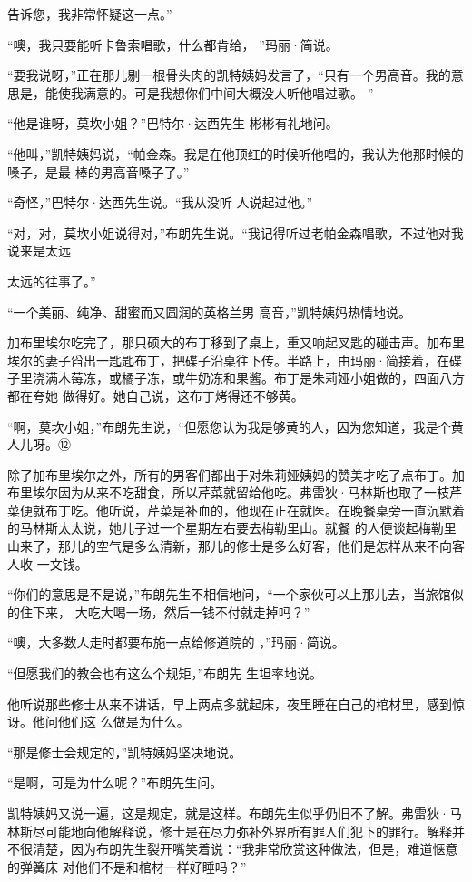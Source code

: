 \documentclass{article}
\begin{document}
\newpage
告诉您，我非常怀疑这一点。” 

“噢，我只要能听卡鲁索唱歌，什么都肯给，
”玛丽·简说。 

“要我说呀，”正在那儿剔一根骨头肉的凯特姨妈发言了，“只有一个男高音。我的意思是，能使我满意的。可是我想你们中间大概没人听他唱过歌。
” 

“他是谁呀，莫坎小姐？”巴特尔·达西先生
彬彬有礼地问。 

“他叫，”凯特姨妈说，“帕金森。我是在他顶红的时候听他唱的，我认为他那时候的嗓子，是最
棒的男高音嗓子了。” 

“奇怪，”巴特尔·达西先生说。“我从没听
人说起过他。” 

“对，对，莫坎小姐说得对，”布朗先生说。“我记得听过老帕金森唱歌，不过他对我说来是太远
\newpage

太远的往事了。” 

“一个美丽、纯净、甜蜜而又圆润的英格兰男
高音，”凯特姨妈热情地说。 

加布里埃尔吃完了，那只硕大的布丁移到了桌上，重又响起叉匙的碰击声。加布里埃尔的妻子舀出一匙匙布丁，把碟子沿桌往下传。半路上，由玛丽·简接着，在碟子里浇满木莓冻，或橘子冻，或牛奶冻和果酱。布丁是朱莉娅小姐做的，四面八方都在夸她
做得好。她自己说，这布丁烤得还不够黄。 

“啊，莫坎小姐，”布朗先生说，“但愿您认为我是够黄的人，因为您知道，我是个黄人儿呀。⑫

除了加布里埃尔之外，所有的男客们都出于对朱莉娅姨妈的赞美才吃了点布丁。加布里埃尔因为从来不吃甜食，所以芹菜就留给他吃。弗雷狄·马林斯也取了一枝芹菜便就布丁吃。他听说，芹菜是补血的，他现在正在就医。在晚餐桌旁一直沉默着的马林斯太太说，她儿子过一个星期左右要去梅勒里山。就餐
\newpage
的人便谈起梅勒里山来了，那儿的空气是多么清新，那儿的修士是多么好客，他们是怎样从来不向客人收
一文钱。 

“你们的意思是不是说，”布朗先生不相信地问，“一个家伙可以上那儿去，当旅馆似的住下来，
大吃大喝一场，然后一钱不付就走掉吗？” 

“噢，大多数人走时都要布施一点给修道院的
，”玛丽·简说。 

“但愿我们的教会也有这么个规矩，”布朗先
生坦率地说。 

他听说那些修士从来不讲话，早上两点多就起床，夜里睡在自己的棺材里，感到惊讶。他问他们这
么做是为什么。 

“那是修士会规定的，”凯特姨妈坚决地说。


\newpage

“是啊，可是为什么呢？”布朗先生问。 

凯特姨妈又说一遍，这是规定，就是这样。布朗先生似乎仍旧不了解。弗雷狄·马林斯尽可能地向他解释说，修士是在尽力弥补外界所有罪人们犯下的罪行。解释并不很清楚，因为布朗先生裂开嘴笑着说：“我非常欣赏这种做法，但是，难道惬意的弹簧床
对他们不是和棺材一样好睡吗？” 
\end{document}
